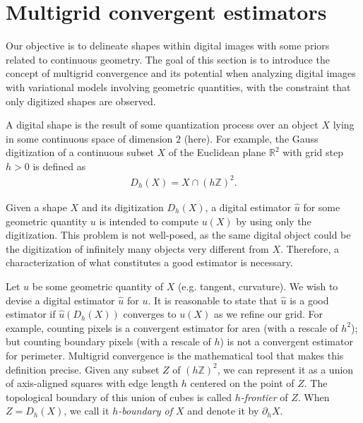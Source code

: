 \documentclass[smallextended]{svjour3}       %
\begin{document}
\section{Multigrid convergent estimators}
Our objective is to delineate shapes within digital images with some priors related to continuous geometry. The goal of
this section is to introduce the concept of multigrid convergence and its potential when analyzing digital images with
variational models involving geometric quantities, with the constraint that only digitized shapes are observed.


A digital shape is the result of some quantization process over an
object $X$ lying in some continuous space of dimension $2$ (here).
For example, the Gauss digitization of a continuous subset $X$ of the
Euclidean plane $\mathbb{R}^2$ with grid step $h>0$ is defined as
\begin{align*}
	D_h(X) = X \cap (h\mathbb{Z})^2.
\end{align*} 

Given a shape $X$ and its digitization $D_h(X)$, a digital estimator $\hat{u}$ for some geometric quantity $u$ is
intended to compute $u(X)$ by using only the digitization. This problem is not well-posed, as the same digital object
could be the digitization of infinitely many objects very different from $X$. Therefore, a characterization of what constitutes
a good estimator is necessary.

Let $u$ be some geometric quantity of $X$ (e.g. tangent, curvature). We wish to devise a digital estimator $\hat{u}$ for
$u$. It is reasonable to state that $\hat{u}$ is a good estimator if $\hat{u}(D_h(X))$ converges to $u(X)$ as we refine
our grid. For example, counting pixels is a convergent estimator for area (with a rescale of $h^2$); but counting
boundary pixels (with a rescale of $h$) is not a convergent estimator for perimeter. Multigrid convergence is the
mathematical tool that makes this definition precise. Given any subset $Z$ of $(h\mathbb{Z})^2$, we can represent it as a
union of axis-aligned squares with edge length $h$ centered on the point of $Z$. The topological boundary of this union
of cubes is called {\em $h$-frontier} of $Z$. When $Z=D_h(X)$, we call it {\em $h$-boundary of $X$} and denote it by
$\partial_h X$.
\end{document}
